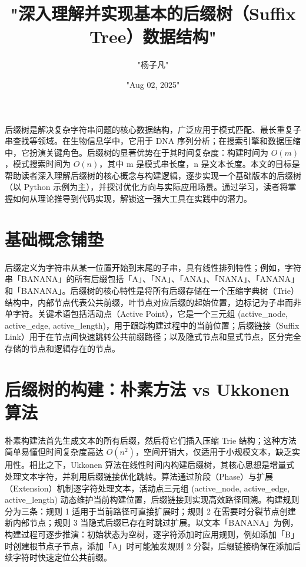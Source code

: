 \title{"深入理解并实现基本的后缀树（Suffix Tree）数据结构"}
\author{"杨子凡"}
\date{"Aug 02, 2025"}
\maketitle
后缀树是解决复杂字符串问题的核心数据结构，广泛应用于模式匹配、最长重复子串查找等领域。在生物信息学中，它用于 DNA 序列分析；在搜索引擎和数据压缩中，它扮演关键角色。后缀树的显著优势在于其时间复杂度：构建时间为 $O(m)$，模式搜索时间为 $O(n)$，其中 m 是模式串长度，n 是文本长度。本文的目标是帮助读者深入理解后缀树的核心概念与构建逻辑，逐步实现一个基础版本的后缀树（以 Python 示例为主），并探讨优化方向与实际应用场景。通过学习，读者将掌握如何从理论推导到代码实现，解锁这一强大工具在实践中的潜力。\par
\chapter{基础概念铺垫}
后缀定义为字符串从某一位置开始到末尾的子串，具有线性排列特性；例如，字符串「BANANA」的所有后缀包括「A」、「NA」、「ANA」、「NANA」、「ANANA」和「BANANA」。后缀树的核心特性是将所有后缀存储在一个压缩字典树（Trie）结构中，内部节点代表公共前缀，叶节点对应后缀的起始位置，边标记为子串而非单字符。关键术语包括活动点（Active Point），它是一个三元组 (active\_{}node, active\_{}edge, active\_{}length)，用于跟踪构建过程中的当前位置；后缀链接（Suffix Link）用于在节点间快速跳转公共前缀路径；以及隐式节点和显式节点，区分完全存储的节点和逻辑存在的节点。\par
\chapter{后缀树的构建：朴素方法 vs Ukkonen 算法}
朴素构建法首先生成文本的所有后缀，然后将它们插入压缩 Trie 结构；这种方法简单易懂但时间复杂度高达 $O(n^2)$，空间开销大，仅适用于小规模文本，缺乏实用性。相比之下，Ukkonen 算法在线性时间内构建后缀树，其核心思想是增量式处理文本字符，并利用后缀链接优化跳转。算法通过阶段（Phase）与扩展（Extension）机制逐字符处理文本，活动点三元组 (active\_{}node, active\_{}edge, active\_{}length) 动态维护当前构建位置，后缀链接则实现高效路径回溯。构建规则分为三条：规则 1 适用于当前路径可直接扩展时；规则 2 在需要时分裂节点创建新内部节点；规则 3 当隐式后缀已存在时跳过扩展。以文本「BANANA」为例，构建过程可逐步推演：初始状态为空树，逐字符添加时应用规则，例如添加「B」时创建根节点子节点，添加「A」时可能触发规则 2 分裂，后缀链接确保在添加后续字符时快速定位公共前缀。\par
